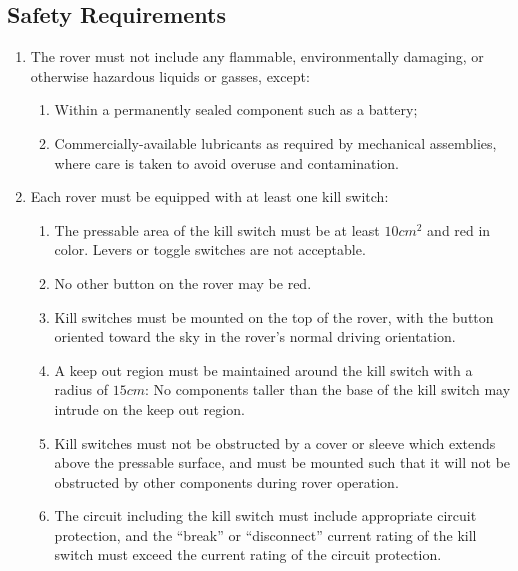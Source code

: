     \clearpage

    \subsection{Safety Requirements}
    


    \begin{enumerate}
        \item The rover must not include any flammable, environmentally damaging, or otherwise hazardous liquids or gasses, except:
        \begin{enumerate}
            \item Within a permanently sealed component such as a battery; \label{battery}
            \item Commercially-available lubricants as required by mechanical assemblies, where care is taken to avoid overuse and contamination. \label{lubricants}
        \end{enumerate}
        \item Each rover must be equipped with at least one kill switch:
        \begin{enumerate}
            \item The pressable area of the kill switch must be at least $10cm^2$ and red in color. Levers or toggle switches are not acceptable.
            \item No other button on the rover may be red.
            \item Kill switches must be mounted on the top of the rover, with the button oriented toward the sky in the rover’s normal driving orientation.
            \item A keep out region must be maintained around the kill switch with a radius of $15cm$: No components taller than the base of the kill switch may intrude on the keep out region.
            \item Kill switches must not be obstructed by a cover or sleeve which extends above the pressable surface, and must be mounted such that it will not be obstructed by other components during rover operation.
            \item The circuit including the kill switch must include appropriate circuit protection, and the “break” or “disconnect” current rating of the kill switch must exceed the current rating of the circuit protection.

\end{enumerate}
\end{enumerate}
